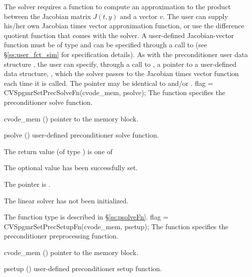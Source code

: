 The 
{\cvspgmr} solver requires a function to compute an approximation to the
product between the Jacobian matrix $J(t,y)$ and a vector $v$.
The user can supply his/her own Jacobian times vector approximation function, 
or use the difference quotient function  
that comes with the {\cvspgmr} solver.
A user-defined Jacobian-vector function must be of type  and 
can be specified through a call to  
(see \S\ref{ss:user_fct_sim} for specification details).
As with the preconditioner user data structure , 
the user can specify, through a call to , a pointer to a 
user-defined data structure, , which
the {\cvspgmr} solver passes to the Jacobian times vector function 
each time it is called.  
The pointer  may be identical to  and/or .
{
  flag = CVSpgmrSetPrecSolveFn(cvode\_mem, psolve);
}
{
  The function  specifies the preconditioner
  solve function.
}
{
  \begin{args}
  \item[cvode\_mem] ()
    pointer to the {\cvode} memory block.
  \item[psolve] ()
    user-defined preconditioner solve function.
  \end{args}
}
{
  The return value  (of type ) is one of
  \begin{args}
  \item[\Id{CVSPGMR\_SUCCESS}] 
    The optional value has been successfully set.
  \item[\Id{CVSPGMR\_MEM\_NULL}]
    The  pointer is .
  \item[\Id{CVSPGMR\_LMEM\_NULL}]
    The {\cvspgmr} linear solver has not been initialized.
  \end{args}
}
{
   The function type  is described in \S\ref{ss:psolveFn}.
}
{
  flag = CVSpgmrSetPrecSetupFn(cvode\_mem, psetup);
}
{
  The function  specifies the preconditioner
  preprocessing function.
}
{
  \begin{args}
  \item[cvode\_mem] ()
    pointer to the {\cvode} memory block.
  \item[psetup] ()
    user-defined preconditioner setup function.
  \end{args}
}
